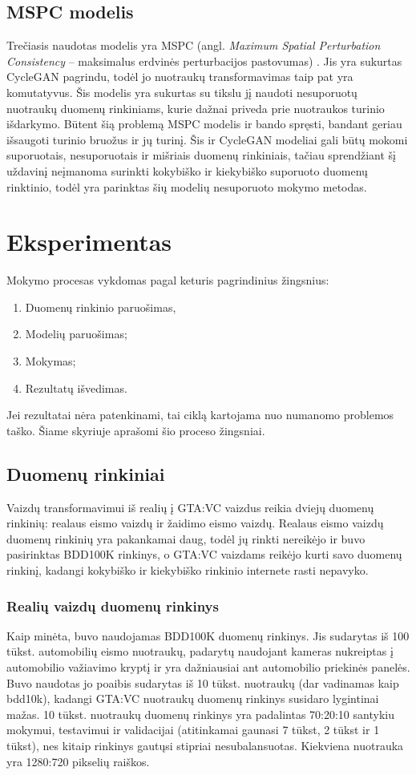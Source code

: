 \documentclass{VUMIFPSkursinis}
\begin{document}
    \subsection{MSPC modelis}
        Trečiasis naudotas modelis yra MSPC (angl. \emph{Maximum Spatial Perturbation Consistency} – maksimalus erdvinės perturbacijos pastovumas) \cite{Mspc}. Jis yra sukurtas CycleGAN \cite{CycleGAN2017} pagrindu, todėl jo nuotraukų transformavimas taip pat yra komutatyvus. Šis modelis yra sukurtas su tikslu jį naudoti nesuporuotų nuotraukų duomenų rinkiniams, kurie dažnai priveda prie nuotraukos turinio išdarkymo. Būtent šią problemą MSPC modelis ir bando spręsti, bandant geriau išsaugoti turinio bruožus ir jų turinį. Šis ir CycleGAN modeliai gali būtų mokomi suporuotais, nesuporuotais ir mišriais duomenų rinkiniais, tačiau sprendžiant šį uždavinį neįmanoma surinkti kokybiško ir kiekybiško suporuoto duomenų rinktinio, todėl yra parinktas šių modelių nesuporuoto mokymo metodas.
\section{Eksperimentas}
    Mokymo procesas vykdomas pagal keturis pagrindinius žingsnius: 
    \begin{enumerate}
        \item Duomenų rinkinio paruošimas,
        \item Modelių paruošimas;
        \item Mokymas;
        \item Rezultatų išvedimas.
    \end{enumerate}
    Jei rezultatai nėra patenkinami, tai ciklą kartojama nuo numanomo problemos taško. Šiame skyriuje aprašomi šio proceso žingsniai.
    \subsection{Duomenų rinkiniai}
            Vaizdų transformavimui iš realių į GTA:VC vaizdus reikia dviejų duomenų rinkinių: realaus eismo vaizdų ir žaidimo eismo vaizdų. Realaus eismo vaizdų duomenų rinkinių yra pakankamai daug, todėl jų rinkti nereikėjo ir buvo pasirinktas BDD100K\cite{BDD100K}  rinkinys, o GTA:VC vaizdams reikėjo kurti savo duomenų rinkinį, kadangi kokybiško ir kiekybiško rinkinio internete rasti nepavyko. 
        \subsubsection{Realių vaizdų duomenų rinkinys}
            Kaip minėta, buvo naudojamas BDD100K duomenų rinkinys. Jis sudarytas iš 100 tūkst. automobilių eismo nuotraukų, padarytų naudojant kameras nukreiptas į automobilio važiavimo kryptį ir yra dažniausiai ant automobilio priekinės panelės. Buvo naudotas jo poaibis sudarytas iš 10 tūkst. nuotraukų (dar vadinamas kaip bdd10k), kadangi GTA:VC nuotraukų duomenų rinkinys susidaro lygintinai mažas. 10 tūkst. nuotraukų duomenų rinkinys yra padalintas 70:20:10 santykiu mokymui, testavimui ir validacijai (atitinkamai gaunasi 7 tūkst, 2 tūkst ir 1 tūkst), nes kitaip rinkinys gautųsi stipriai nesubalansuotas. Kiekviena nuotrauka yra 1280:720 pikselių raiškos.
            
\end{document}
